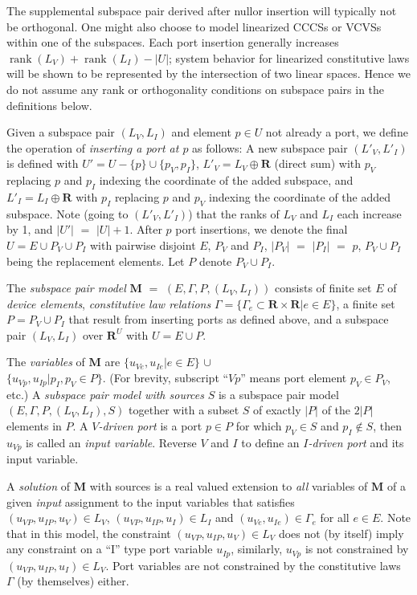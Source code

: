 \documentclass{article}
\def\Reals{\ensuremath{\mathbf R}}
\DeclareMathOperator{\rank}{rank}
\begin{document}
The supplemental subspace pair derived after nullor 
insertion will typically not be orthogonal.  One might also choose to
model linearized CCCSs or VCVSs within one of the subspaces.  
Each port insertion generally increases $\rank(L_V)+\rank(L_I)-|U|$;
system behavior for linearized constitutive laws will be shown to be
represented by the intersection of two linear spaces.
Hence we do not assume any rank or orthogonality conditions on subspace 
pairs in the definitions below.

Given a subspace pair $(L_V, L_I)$ and element $p\in U$ not already a port, 
we define the 
operation of \textit{inserting a port at  $p$} 
as follows: A new subspace pair $(L'_V, L'_I)$
is defined with $U'=U-\{p\}\cup\{p_V,p_I\}$, $L'_V=L_V\oplus\Reals$ (direct 
sum) with $p_V$ replacing $p$ and $p_I$ indexing the coordinate of the added
subspace, and $L'_I=L_I\oplus\Reals$ with $p_I$ replacing $p$ and $p_V$ 
indexing the coordinate of the added subspace.  Note (going to 
$(L'_V, L'_I)$) that the ranks of
$L_V$ and $L_I$ each increase by 1, and $|U'|$ $=$ $|U|+1$.  After $p$ port
insertions, we denote the final $U=E\cup P_V \cup P_I$ with pairwise disjoint
$E$, $P_V$ and $P_I$, $|P_V|$ $=$ $|P_I|$ $=$ $p$, $P_V\cup P_I$ being the 
replacement elements.  Let $P$ denote $P_V \cup P_I$.  

The \textit{subspace pair model} $\mathbf{M}$ $=$ 
$(E, \Gamma, P, (L_V, L_I))$ consists of finite set $E$ of 
\textit{device elements}, \textit{constitutive law relations}
$\Gamma = \{\Gamma_e\subset\Reals\times\Reals | e \in E\}$, a finite set
$P=P_V \cup P_I$ that result from inserting ports as defined above, 
and a subspace pair $(L_V, L_I)$ over $\Reals^U$ with $U=E\cup P$.

The \textit{variables} of $\mathbf{M}$ are 
$\{u_{Ve}, u_{Ie} | e \in E\}$  $\cup$ \\
$\{ u_{Vp}, u_{Ip} | p_I, p_V \in P \}$.  
(For brevity, subscript ``$Vp$'' means port element
$p_V\in P_V$, etc.)
A \textit{subspace pair model with sources} $S$ 
is a subspace pair model $(E, \Gamma, P, (L_V, L_I), S)$
together with a subset $S$ of exactly $|P|$ of the $2|P|$ elements
in $P$.  A \textit{$V$-driven port} is a port $p\in P$ for which 
$p_V\in S$ and $p_I\not\in S$, then $u_{Vp}$ is called 
an \textit{input variable}.   Reverse $V$ and $I$ to define an 
\textit{$I$-driven port} and its input variable.

A \textit{solution} of $\mathbf{M}$ with sources
is a real valued extension to \textit{all} variables of $\mathbf{M}$ 
of a given \textit{input} assignment to the input variables
that satisfies\\
$(u_{VP}, u_{IP}, u_V) \in L_V$,
$(u_{VP}, u_{IP}, u_I) \in L_I$
and
$(u_{Ve}, u_{Ie}) \in \Gamma_e$ for all
$e\in E$.  Note that in this model, the constraint 
$(u_{VP}, u_{IP}, u_V) \in L_V$ does not (by itself) imply any constraint
on a ``I'' type port variable $u_{Ip}$, similarly, $u_{Vp}$ is not constrained
by $(u_{VP}, u_{IP}, u_I) \in L_V$.  Port variables are not constrained
by the constitutive laws $\Gamma$ (by themselves) either.
\end{document}

